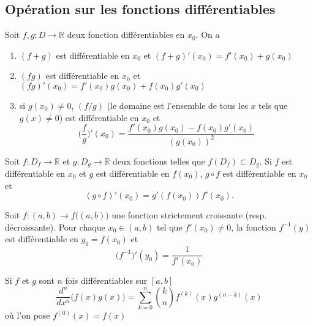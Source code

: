 	\subsection{Opération sur les fonctions différentiables}
		\begin{mythm}
			Soit $f,g:D\longrightarrow\mathbb{R}$ deux fonction différentiables en $x_0$. On a
			\begin{enumerate}[label=\alph*)]
				\item $(f+g)$ est différentiable en $x_0$ et $(f+g)'(x_0)=f'(x_0)+g(x_0)$
				\item $(fg)$ est différentiable en $x_0$ et $(fg)'(x_0)=f'(x_0)g(x_0)+f(x_0)g'(x_0)$
				\item si $g(x_0)\neq 0$, $(f/g)$ (le domaine est l'ensemble de tous les $x$ tels que $g(x)\neq 0$) est différentiable en $x_0$ et \[\Big(\frac{f}{g}\Big)'(x_0)=\frac{f'(x_0)g(x_0)-f(x_0)g'(x_0)}{(g(x_0))^2}\]
			\end{enumerate}
		\end{mythm}
		\begin{mythm}
			Soit $f:D_f\longrightarrow\mathbb{R}$ et $g:D_g\longrightarrow\mathbb{R}$ deux fonctions telles que $f(D_f)\subset D_g$. Si $f$ est différentiable en $x_0$ et $g$ est différentiable en $f(x_0)$, $g\circ f$ est différentiable en $x_0$ et \[(g\circ f)'(x_0)=g'(f(x_0))f'(x_0).\]
		\end{mythm}
		\begin{mythm}
			Soit $f:(a,b)\longrightarrow f\big((a,b)\big)$ une fonction strictement croissante (resp. décroissante). Pour chaque $x_0\in (a,b)$ tel que $f'(x_0)\neq 0$, la fonction $f^{-1}(y)$ est différentiable en $y_0=f(x_0)$ et
			\[\big(f^{-1}\big)'(y_0)=\frac{1}{f'(x_0)}\] 
		\end{mythm}
		\begin{mythm}\index{Formule de Leibniz}
			Si $f$ et $g$ sont $n$ fois différentiables sur $[a,b]$
			\[\frac{d^n}{dx^n}\big(f(x)g(x)\big)=\sum_{k=0}^{n}\binom{k}{n}f^{(k)}(x)g^{(n-k)}(x)\]
			où l'on pose $f^{(0)}(x)=f(x)$
		\end{mythm}

